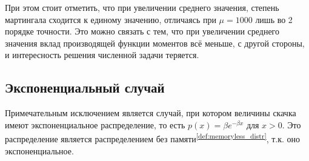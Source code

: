 \documentclass[a4paper,12pt]{article}
\theoremstyle{definition}
\begin{document}
При этом стоит отметить, что при увеличении среднего значения, степень мартингала сходится к единому значению, отличаясь при $\mu = 1000$ лишь во 2 порядке точности. Это можно связать с тем, что при увеличении среднего значения вклад производящей функции моментов всё меньше, с другой стороны, и интересность решения численной задачи теряется.

\subsection{Экспоненциальный случай}

Примечательным исключением является случай, при котором величины скачка имеют экспоненциальное распределение, то есть $p(x) = \beta e^{-\beta x}$ для $x > 0$. Это распределение является распределением без памяти\textsuperscript{{\ref{def:memoryless_distr}}}, т.к. оно экспоненциальное.
\end{document}
